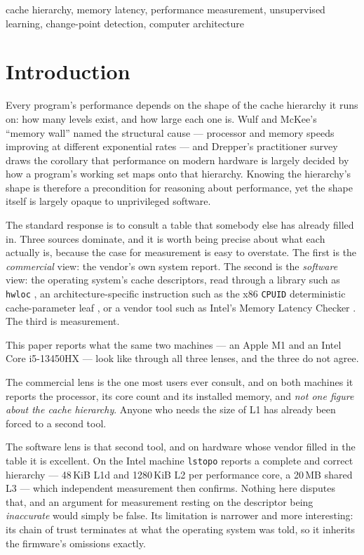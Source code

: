 \documentclass[conference]{IEEEtran}
\begin{document}
\begin{IEEEkeywords}
cache hierarchy, memory latency, performance measurement, unsupervised learning,
change-point detection, computer architecture
\end{IEEEkeywords}

\section{Introduction}
\label{sec:intro}

Every program's performance depends on the shape of the cache hierarchy it runs
on: how many levels exist, and how large each one is. Wulf and McKee's ``memory
wall'' \citep{wulf1995} named the structural cause --- processor and memory
speeds improving at different exponential rates --- and Drepper's
practitioner survey \citep{drepper2007} draws the corollary that performance on
modern hardware is largely decided by how a program's working set maps onto that
hierarchy. Knowing the hierarchy's shape is therefore a precondition for
reasoning about performance, yet the shape itself is largely opaque to
unprivileged software.

The standard response is to consult a table that somebody else has already filled
in. Three sources dominate, and it is worth being precise about what each
actually is, because the case for measurement is easy to overstate. The first is
the \emph{commercial} view: the vendor's own system report. The second is the
\emph{software} view: the operating system's cache descriptors, read through a
library such as \texttt{hwloc} \citep{broquedis2010}, an architecture-specific
instruction such as the x86 \texttt{CPUID} deterministic cache-parameter leaf
\citep{intel2023}, or a vendor tool such as Intel's Memory Latency Checker
\citep{intel_mlc}. The third is measurement.

This paper reports what the same two machines --- an Apple M1 and an Intel
Core i5-13450HX --- look like through all three lenses, and the three do not
agree.

The commercial lens is the one most users ever consult, and on both machines it
reports the processor, its core count and its installed memory, and \emph{not one
figure about the cache hierarchy}. Anyone who needs the size of L1 has already
been forced to a second tool.

The software lens is that second tool, and on hardware whose vendor filled in the
table it is excellent. On the Intel machine \texttt{lstopo} reports a complete and
correct hierarchy --- 48\,KiB L1d and 1280\,KiB L2 per performance core, a
20\,MB shared L3 --- which independent measurement then confirms. Nothing here
disputes that, and an argument for measurement resting on the descriptor being
\emph{inaccurate} would simply be false. Its limitation is narrower and more
interesting: its chain of trust terminates at what the operating system was told,
so it inherits the firmware's omissions exactly.
\end{document}
